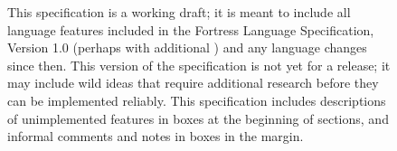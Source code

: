 \begin{figure}[p]
This specification is a working draft;
it is meant to include all language features included in
the Fortress Language Specification, Version 1.0\EXP{\beta{}}
(perhaps with additional ) and any language changes since then.
This version of the specification is not yet for a release;
it may include wild ideas that require additional research before they can be
implemented reliably.
This specification includes descriptions of unimplemented features in boxes
at the beginning of sections,
and informal comments and notes in boxes in the margin.







\end{figure}

